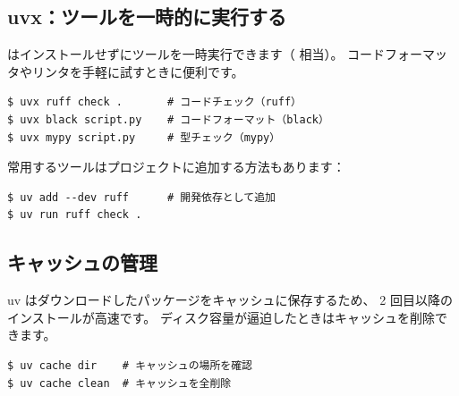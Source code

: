 \subsection{uvx：ツールを一時的に実行する}

 はインストールせずにツールを一時実行できます（ 相当）。
コードフォーマッタやリンタを手軽に試すときに便利です。

\begin{wslbox}
\begin{lstlisting}[style=bash]
$ uvx ruff check .       # コードチェック（ruff）
$ uvx black script.py    # コードフォーマット（black）
$ uvx mypy script.py     # 型チェック（mypy）
\end{lstlisting}
\end{wslbox}

常用するツールはプロジェクトに追加する方法もあります：

\begin{wslbox}[開発ツールをプロジェクトに追加]
\begin{lstlisting}[style=bash]
$ uv add --dev ruff      # 開発依存として追加
$ uv run ruff check .
\end{lstlisting}
\end{wslbox}

\subsection{キャッシュの管理}

uv はダウンロードしたパッケージをキャッシュに保存するため、
2 回目以降のインストールが高速です。
ディスク容量が逼迫したときはキャッシュを削除できます。

\begin{wslbox}[キャッシュの確認と削除]
\begin{lstlisting}[style=bash]
$ uv cache dir    # キャッシュの場所を確認
$ uv cache clean  # キャッシュを全削除
\end{lstlisting}
\end{wslbox}
